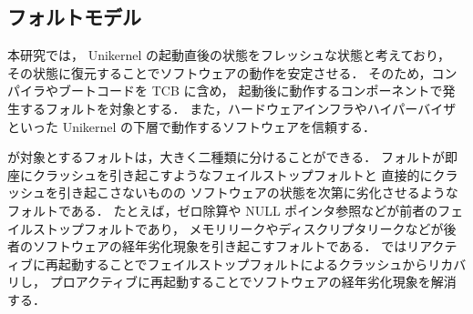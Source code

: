 









\subsection{フォルトモデル}


本研究では，
Unikernel の起動直後の状態をフレッシュな状態と考えており，
その状態に復元することでソフトウェアの動作を安定させる．
そのため，コンパイラやブートコードを TCB に含め，
起動後に動作するコンポーネントで発生するフォルトを対象とする．
また，ハードウェアインフラやハイパーバイザといった Unikernel の下層で動作するソフトウェアを信頼する．

\rr が対象とするフォルトは，大きく二種類に分けることができる．
フォルトが即座にクラッシュを引き起こすようなフェイルストップフォルトと
直接的にクラッシュを引き起こさないものの
ソフトウェアの状態を次第に劣化させるようなフォルトである．
たとえば，ゼロ除算や NULL ポインタ参照などが前者のフェイルストップフォルトであり，
メモリリークやディスクリプタリークなどが後者のソフトウェアの経年劣化現象を引き起こすフォルトである．
\rr ではリアクティブに再起動することでフェイルストップフォルトによるクラッシュからリカバリし，
プロアクティブに再起動することでソフトウェアの経年劣化現象を解消する．

